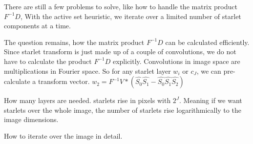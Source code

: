 There are still a few problems to solve, like how to handle the matrix product $F^{-1}D$, 
With the active set heuristic, we iterate over a limited number of starlet components at a time. 

The question remains, how the matrix product $F^{-1}D$ can be calculated efficiently. Since starlet transform is just made up of a couple of convolutions, we do not have to calculate the product $F^{-1}D$ explicitly. Convolutions in image space are multiplications in Fourier space. 
So for any starlet layer $w_i$ or $c_J$, we can pre-calculate a transform vector. 
$w_2 = F^{-1}V * (\hat{S_0}\hat{S_1} - \hat{S_0}\hat{S_1}\hat{S_2})$

How many layers are needed. starlets rise in pixels with $2^J$. Meaning if we want starlets over the whole image, the number of starlets rise logarithmically to the image dimensions.

How to iterate over the image in detail.


